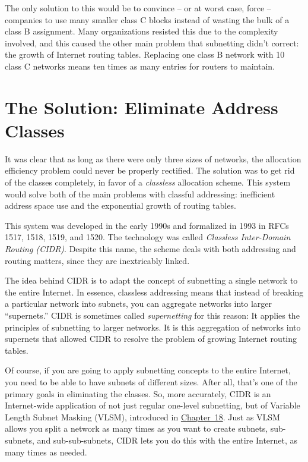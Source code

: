 The only solution to this would be to convince -- or at worst case,
force -- companies to use many smaller class C blocks instead of wasting
the bulk of a class B assignment. Many organizations resisted this due
to the complexity involved, and this caused the other main problem that
subnetting didn't correct: the growth of Internet routing tables.
Replacing one class B network with 10 class C networks means ten times
as many entries for routers to maintain.

\section{The Solution: Eliminate Address Classes}

It was clear that as long as there were only three sizes of networks,
the allocation efficiency problem could never be properly rectified. The
solution was to get rid of the classes completely, in favor of a
\protect\hypertarget{ch20.htmlux5cux23idx-CHP-20-0760}{}{}{\emph{classless}}
allocation scheme. This system would solve both of the main problems
with classful addressing: inefficient address space use and the
exponential growth of routing tables.

This system was developed in the early 1990s and formalized in 1993 in
RFCs 1517, 1518, 1519, and 1520. The technology was called
{\emph{Classless Inter-Domain Routing (CIDR)}}. Despite this name, the
scheme deals with both addressing and routing matters, since they are
inextricably linked.

The idea behind CIDR is to adapt the concept of subnetting a single
network to the entire Internet. In essence, classless addressing means
that instead of breaking a particular network into subnets, you can
aggregate networks into larger ``supernets.''
CIDR is sometimes called {\emph{supernetting}} for this reason: It applies the principles of
subnetting to larger networks. It is this aggregation of networks into
supernets that allowed CIDR to resolve the problem of growing Internet
routing tables.

Of course, if you are going to apply subnetting concepts to the entire
Internet, you need to be able to have subnets of different sizes. After
all, that's one of the primary goals in eliminating the classes. So,
more accurately, CIDR is an Internet-wide application of not just
regular one-level subnetting, but of Variable Length Subnet Masking
(VLSM), introduced in \protect\hyperlink{ch18.html}{Chapter~18}. Just as
VLSM allows you split a network as many times as you want to create
subnets, sub-subnets, and sub-sub-subnets, CIDR lets you do this with
the entire Internet, as many times as needed.


